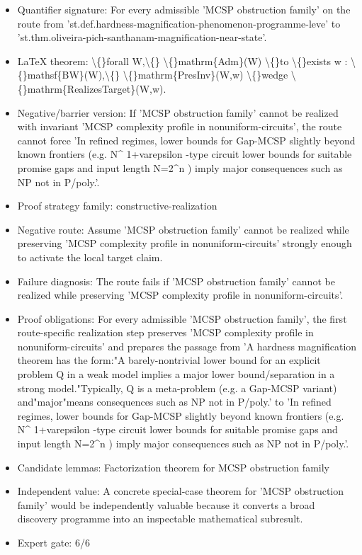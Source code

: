 \documentclass[11pt]{article}
\begin{document}
\begin{itemize}
\item Quantifier signature: For every admissible 'MCSP obstruction family' on the route from 'st.def.hardness-magnification-phenomenon-programme-leve' to 'st.thm.oliveira-pich-santhanam-magnification-near-state'.
\item LaTeX theorem: \textbackslash\{\}forall W,\textbackslash\{\} \textbackslash\{\}mathrm\{Adm\}(W) \textbackslash\{\}to \textbackslash\{\}exists w : \textbackslash\{\}mathsf\{BW\}(W),\textbackslash\{\} \textbackslash\{\}mathrm\{PresInv\}(W,w) \textbackslash\{\}wedge \textbackslash\{\}mathrm\{RealizesTarget\}(W,w).
\item Negative/barrier version: If 'MCSP obstruction family' cannot be realized with invariant 'MCSP complexity profile in nonuniform-circuits', the route cannot force 'In refined regimes, lower bounds for Gap-MCSP slightly beyond known frontiers (e.g. N\textasciicircum{} 1+varepsilon -type circuit lower bounds for suitable promise gaps and input length N=2\textasciicircum{}n ) imply major consequences such as NP not in P/poly.'.
\item Proof strategy family: constructive-realization
\item Negative route: Assume 'MCSP obstruction family' cannot be realized while preserving 'MCSP complexity profile in nonuniform-circuits' strongly enough to activate the local target claim.
\item Failure diagnosis: The route fails if 'MCSP obstruction family' cannot be realized while preserving 'MCSP complexity profile in nonuniform-circuits'.
\item Proof obligations: For every admissible 'MCSP obstruction family', the first route-specific realization step preserves 'MCSP complexity profile in nonuniform-circuits' and prepares the passage from 'A hardness magnification theorem has the form:"A barely-nontrivial lower bound for an explicit problem Q in a weak model implies a major lower bound/separation in a strong model."Typically, Q is a meta-problem (e.g. a Gap-MCSP variant) and"major"means consequences such as NP not in P/poly.' to 'In refined regimes, lower bounds for Gap-MCSP slightly beyond known frontiers (e.g. N\textasciicircum{} 1+varepsilon -type circuit lower bounds for suitable promise gaps and input length N=2\textasciicircum{}n ) imply major consequences such as NP not in P/poly.'.
\item Candidate lemmas: Factorization theorem for MCSP obstruction family
\item Independent value: A concrete special-case theorem for 'MCSP obstruction family' would be independently valuable because it converts a broad discovery programme into an inspectable mathematical subresult.
\item Expert gate: 6/6
\end{itemize}
\end{document}
